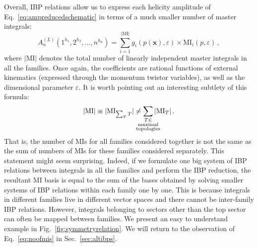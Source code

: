 \documentclass[main.tex]{subfiles}
\begin{document}
Overall, IBP relations allow us to express each helicity amplitude of Eq.~\ref{eq:ampreducedschematic} in terms of a much smaller number of master integrals:
\begin{equation} \label{eq:ampafterIBP}
    	A_n^{(L)} \left(1^{h_1}, 2^{h_2}, \ldots, n^{h_n} \right) =  
     \sum_{i=1}^{|\text{MI}|} g_i(p(\mathbf{x}), \varepsilon) \times \text{MI}_i(p,\varepsilon)\,,
\end{equation}
where $|\text{MI}|$ denotes the total number of linearly independent master integrals in all the families. Once again, the coefficients are rational functions of external kinematics (expressed through the momentum twistor variables), as well as the dimensional parameter $\varepsilon$. It is worth pointing out an interesting subtlety of this formula:
\begin{equation} \label{eq:noofmis}
    |\text{MI}| \equiv |\text{MI}_{\sum_T T}| \neq \sum_{\mathclap{\substack{T \in \\ \text{maximal} \\ \text{topologies}}}} |\text{MI}_T| \,.
\end{equation}
That is, the number of MIs for all families considered together is not the same as the sum of numbers of MIs for these families considered separately. This statement might seem surprising. Indeed, if we formulate one big system of IBP relations between integrals in all the families and perform the IBP reduction, the resultant MI basis is equal to the sum of the bases obtained by solving smaller systems of IBP relations within each family one by one. This is because integrals in different families live in different vector spaces and there cannot be inter-family IBP relations. However, integrals belonging to sectors other than the top sector can often be mapped between families. We present an easy to understand example in Fig.~\ref{fig:symmetryrelation}. We will return to the observation of Eq.~\ref{eq:noofmis} in Sec.~\ref{sec:altibps}. 
\end{document}

